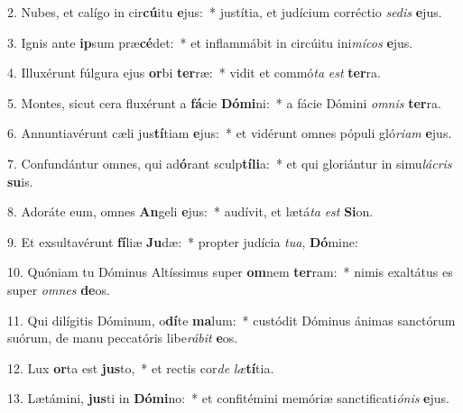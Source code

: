 2. Nubes, et calígo in cir\textbf{cú}itu \textbf{e}jus:~*  justítia, et judícium corréctio \textit{se}\textit{dis} \textbf{e}jus.\

3. Ignis ante \textbf{ip}sum præ\textbf{cé}det:~*  et inflammábit in circúitu ini\textit{mí}\textit{cos} \textbf{e}jus.\

4. Illuxérunt fúlgura ejus \textbf{or}bi \textbf{ter}ræ:~*  vidit et commó\textit{ta} \textit{est} \textbf{ter}ra.\

5. Montes, sicut cera fluxérunt a \textbf{fá}cie \textbf{Dó}\textbf{mi}ni:~*  a fácie Dómini \textit{om}\textit{nis} \textbf{ter}ra.\

6. Annuntiavérunt cæli jus\textbf{tí}tiam \textbf{e}jus:~*  et vidérunt omnes pópuli gló\textit{ri}\textit{am} \textbf{e}jus.\

7. Confundántur omnes, qui ad\textbf{ó}rant sculp\textbf{tí}\textbf{li}a:~*  et qui gloriántur in simu\textit{lá}\textit{cris} \textbf{su}is.\

8. Adoráte eum, omnes \textbf{An}geli \textbf{e}jus:~*  audívit, et lætá\textit{ta} \textit{est} \textbf{Si}on.\

9. Et exsultavérunt \textbf{fí}liæ \textbf{Ju}dæ:~*  propter judícia \textit{tu}\textit{a}, \textbf{Dó}mine:\

10. Quóniam tu Dóminus Altíssimus super \textbf{om}nem \textbf{ter}ram:~*  nimis exaltátus es super \textit{om}\textit{nes} \textbf{de}os.\

11. Qui dilígitis Dóminum, o\textbf{dí}te \textbf{ma}lum:~*  custódit Dóminus ánimas sanctórum suórum, de manu peccatóris libe\textit{rá}\textit{bit} \textbf{e}os.\

12. Lux \textbf{or}ta est \textbf{jus}to,~*  et rectis cor\textit{de} \textit{læ}\textbf{tí}tia.\

13. Lætámini, \textbf{jus}ti in \textbf{Dó}\textbf{mi}no:~*  et confitémini memóriæ sanctificati\textit{ó}\textit{nis} \textbf{e}jus.\


